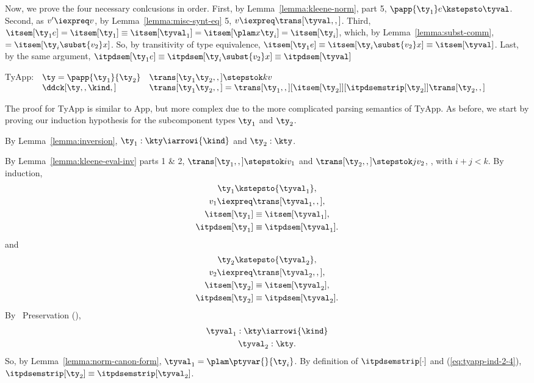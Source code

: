 \begin{list}{\textbf{Proof:}}{
      \setlength{\leftmargin}{0in}
      \setlength{\listparindent}{0in}}
\begin{caseproof}
Now, we prove the four necessary conlcusions in order. First, by
Lemma~\ref{lemma:kleene-norm}, part 5,
  $\papp {\ty_1} e \kstepsto \tyval$.
Second, as $v' \iexpreq v$, by Lemma~\ref{lemma:misc-synt-eq} 5,
  $v \iexpreq \trans[\tyval,,]$. 
Third,$\itsem[{\ty_1} e] =
  \itsem[{\ty_1}] \equiv \itsem[{\tyval_1}] = \itsem[\plam x {}
  {\ty_i}] = \itsem[{\ty_i}]$, which, by Lemma~\ref{lemma:subst-comm},
$= \itsem[{\ty_i}\subst {v_2} x]$. 
So, by transitivity of type equivalence,
  $\itsem[{\ty_1} e] \equiv \itsem[{\ty_i}\subst {v_2} x] \equiv \itsem[\tyval]$.
Last, by the same argument,
  $\itpdsem[{\ty_1} e] \equiv \itpdsem[{\ty_i}\subst {v_2} x] \equiv \itpdsem[\tyval]$

\item TyApp:\quad
$\begin{array}[t]{ll}
  \ty = \papp {\ty_1} {\ty_2} & \trans[{\ty_1} {\ty_2},,] \stepstok k v \\
  \ddck[\ty,,\kind,] & \trans[{\ty_1} {\ty_2},,] = \trans[{\ty_1},,]  [ \itsem[{\ty_2}] ] [ \itpdsemstrip[{\ty_2}] ] \trans[{\ty_2},,]
\end{array}$

The proof for TyApp is similar to App, but more complex due to the
more complicated parsing semantics of TyApp. As before, we start by
proving our induction hypothesis for the subcomponent types $\ty_1$
and $\ty_2$.

By Lemma~\ref{lemma:inversion}, ${\ty_1} : \kty \iarrowi {\kind}$ and 
${\ty_2}: \kty$.

By Lemma~\ref{lemma:kleene-eval-inv} parts 1 \& 2,
  $\trans[{\ty_1},,] \stepstok i {v_1}$ and $\trans[{\ty_2},,]
  \stepstok j
  {v_2}$, , with $i+j < k$.
By induction,
\begin{gather}
  {\ty_1} \kstepsto {\tyval_1},\\
  {v_1} \iexpreq \trans[{\tyval_1},,], \label{eq:tyapp-ind-1-2}\\
  \itsem[{\ty_1}] \equiv \itsem[{\tyval_1}], \\
  \itpdsem[{\ty_1}] \equiv \itpdsem[{\tyval_1}].
\end{gather}
and
\begin{gather}
  {\ty_2} \kstepsto {\tyval_2},\\
  {v_2} \iexpreq \trans[{\tyval_2},,],\label{eq:tyapp-ind-2-2}\\
  \itsem[{\ty_2}] \equiv \itsem[{\tyval_2}],\\
  \itpdsem[{\ty_2}] \equiv \itpdsem[{\tyval_2}]. \label{eq:tyapp-ind-2-4}
\end{gather}
By \ddc\ Preservation (),
\begin{gather}
  {\tyval_1}:\kty \iarrowi {\kind}\\
  {\tyval_2}:\kty. \label{eq:ec-tyapp-4}
\end{gather}
So, by Lemma~\ref{lemma:norm-canon-form},
  ${\tyval_1} = {\plam \ptyvar {} {\ty_i}}$.
By definition of $\itpdsemstrip[\cdot]$ and (\ref{eq:tyapp-ind-2-4}),
  $\itpdsemstrip[{\ty_2}] \equiv \itpdsemstrip[{\tyval_2}]$.


\end{caseproof}
\end{list}
